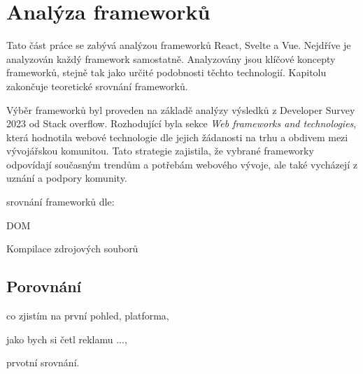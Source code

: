 \section{Analýza frameworků}

Tato část práce se zabývá analýzou frameworků React, Svelte a Vue. Nejdříve je analyzován každý framework samostatně. 
Analyzovány jsou klíčové koncepty frameworků, stejně tak jako určité podobnosti těchto technologií. Kapitolu zakončuje teoretické srovnání frameworků.

Výběr frameworků byl proveden na základě analýzy výsledků z Developer Survey 2023 od Stack overflow. 
Rozhodující byla sekce \textit{Web frameworks and technologies}, která hodnotila webové technologie dle jejich žádanosti na trhu a obdivem mezi vývojářskou komunitou. 
Tato strategie zajistila, že vybrané frameworky odpovídají současným trendům a potřebám webového vývoje, ale také vycházejí z uznání a podpory komunity.

\begin{citemize}
	\item srovnání frameworků dle:
	\begin{cenumerate}
		\item DOM %
		\item Kompilace zdrojových souborů %
	\end{cenumerate}
\end{citemize}







\subsection{Porovnání}

\begin{citemize}
	\item co zjistím na první pohled, platforma,
	\item jako bych si četl reklamu ...,
	\item prvotní srovnání.
\end{citemize}
